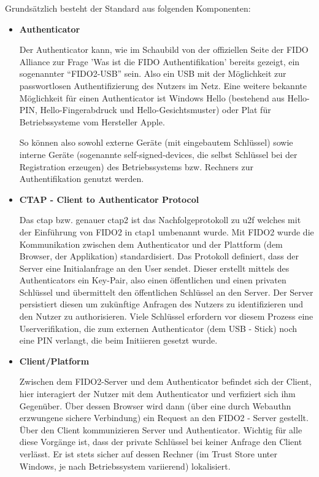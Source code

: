 Grundsätzlich besteht der Standard aus folgenden Komponenten:

\begin{itemize} 
\item \textbf{Authenticator}

Der Authenticator kann, wie im Schaubild von der offiziellen Seite der FIDO Alliance zur Frage 'Was ist die FIDO Authentifikation' bereits gezeigt, ein sogenannter ``FIDO2-USB'' sein. Also ein USB mit der Möglichkeit zur passwortlosen Authentifizierung des Nutzers im Netz. Eine weitere bekannte Möglichkeit für einen Authenticator ist Windows Hello (bestehend aus Hello-PIN, Hello-Fingerabdruck und Hello-Gesichtsmuster) oder Plat für Betriebssysteme vom Hersteller Apple.

So können also sowohl externe Geräte (mit eingebautem Schlüssel) sowie interne Geräte (sogenannte self-signed-devices, die selbst Schlüssel bei der Registration erzeugen) des Betriebssystems bzw. Rechners zur Authentifikation genutzt werden.
\newpage

\item \textbf{CTAP - Client to Authenticator Protocol}

Das \ac{ctap} bzw. genauer \ac{ctap}2 ist das Nachfolgeprotokoll zu \ac{u2f} welches mit der Einführung von FIDO2 in \ac{ctap}1 umbenannt wurde. Mit FIDO2 wurde die Kommunikation zwischen dem Authenticator und der Plattform (dem Browser, der Applikation) standardisiert. Das Protokoll definiert, dass der Server eine Initialanfrage an den User sendet. Dieser erstellt mittels des Authenticators ein Key-Pair, also einen öffentlichen und einen privaten Schlüssel und übermittelt den öffentlichen Schlüssel an den Server. Der Server persistiert diesen um zukünftige Anfragen des Nutzers zu identifizieren und den Nutzer zu authorisieren. Viele Schlüssel erfordern vor diesem Prozess eine Userverifikation, die zum externen Authenticator (dem USB - Stick) noch eine PIN verlangt, die beim Initiieren gesetzt wurde.

\item \textbf{Client/Platform}

Zwischen dem FIDO2-Server und dem Authenticator befindet sich der Client, hier interagiert der Nutzer mit dem Authenticator und verfiziert sich ihm Gegenüber. Über dessen Browser wird dann (über eine durch Webauthn erzwungene sichere Verbindung) ein Request an den FIDO2 - Server gestellt. Über den Client kommunizieren Server und Authenticator. Wichtig für alle diese Vorgänge ist, dass der private Schlüssel bei keiner Anfrage den Client verlässt. Er ist stets sicher auf dessen Rechner (im Trust Store unter Windows, je nach Betriebssystem variierend) lokalisiert.


\end{itemize}
